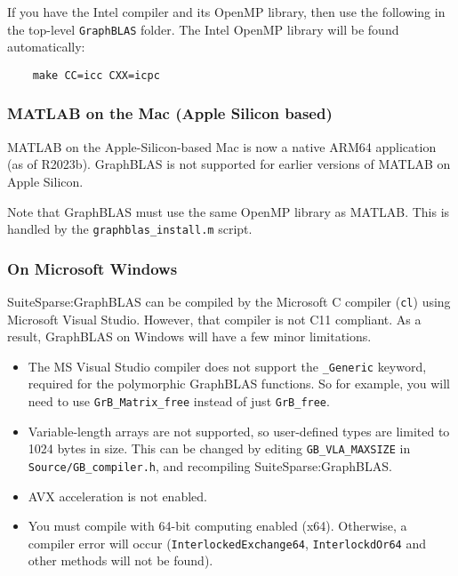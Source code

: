 \documentclass[12pt]{article}
\begin{document}
If you have the Intel compiler and its OpenMP library, then use the following
in the top-level \verb'GraphBLAS' folder.  The Intel OpenMP library
will be found automatically:

    {\small
    \begin{verbatim}
    make CC=icc CXX=icpc \end{verbatim} }

\subsubsection{MATLAB on the Mac (Apple Silicon based)}

MATLAB on the Apple-Silicon-based Mac is now a native ARM64 application (as of
R2023b).  GraphBLAS is not supported for earlier versions of MATLAB on Apple
Silicon.

Note that GraphBLAS must use the same OpenMP library as MATLAB.  This is
handled by the \verb'graphblas_install.m' script.

\subsubsection{On Microsoft Windows}
\label{sec:windows}

SuiteSparse:GraphBLAS can be compiled by the Microsoft C compiler (\verb'cl')
using Microsoft Visual Studio.  However, that compiler is not C11 compliant. As
a result, GraphBLAS on Windows will have a few minor limitations.

\begin{itemize}
\item The MS Visual Studio compiler does not support the \verb'_Generic'
keyword, required for the polymorphic GraphBLAS functions.  So for example, you
will need to use \verb'GrB_Matrix_free' instead of just \verb'GrB_free'.

\item Variable-length arrays are not supported, so user-defined
types are limited to 1024 bytes in size.  This can be changed by editing
\verb'GB_VLA_MAXSIZE' in \verb'Source/GB_compiler.h', and recompiling
SuiteSparse:GraphBLAS.

\item AVX acceleration is not enabled.

\item You must compile with 64-bit computing enabled (x64).  Otherwise, a
compiler error will occur (\verb'InterlockedExchange64', \verb'InterlockdOr64'
and other methods will not be found).

\end{itemize}
\end{document}

